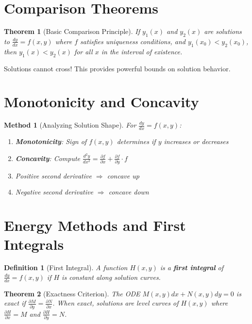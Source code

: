 \documentclass[12pt]{article}
\newtheorem{definition}{Definition}
\newtheorem{theorem}{Theorem}
\newtheorem{method}{Method}
\begin{document}
\section{Comparison Theorems}

\begin{theorem}[Basic Comparison Principle]
If $y_1(x)$ and $y_2(x)$ are solutions to $\frac{dy}{dx} = f(x,y)$ where $f$ satisfies uniqueness conditions, and $y_1(x_0) < y_2(x_0)$, then $y_1(x) < y_2(x)$ for all $x$ in the interval of existence.
\end{theorem}

\begin{keypoint}
Solutions cannot cross! This provides powerful bounds on solution behavior.
\end{keypoint}

\section{Monotonicity and Concavity}

\begin{method}[Analyzing Solution Shape]
For $\frac{dy}{dx} = f(x,y)$:
\begin{enumerate}
    \item \textbf{Monotonicity}: Sign of $f(x,y)$ determines if $y$ increases or decreases
    \item \textbf{Concavity}: Compute $\frac{d^2y}{dx^2} = \frac{\partial f}{\partial x} + \frac{\partial f}{\partial y} \cdot f$
    \item Positive second derivative $\Rightarrow$ concave up
    \item Negative second derivative $\Rightarrow$ concave down
\end{enumerate}
\end{method}

\section{Energy Methods and First Integrals}

\begin{definition}[First Integral]
A function $H(x,y)$ is a \textbf{first integral} of $\frac{dy}{dx} = f(x,y)$ if $H$ is constant along solution curves.
\end{definition}

\begin{theorem}[Exactness Criterion]
The ODE $M(x,y)dx + N(x,y)dy = 0$ is exact if $\frac{\partial M}{\partial y} = \frac{\partial N}{\partial x}$. When exact, solutions are level curves of $H(x,y)$ where $\frac{\partial H}{\partial x} = M$ and $\frac{\partial H}{\partial y} = N$.
\end{theorem}
\end{document}
